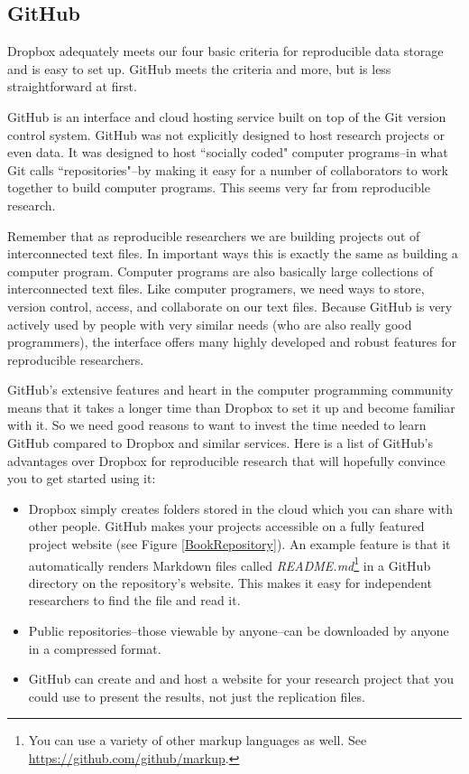 \subsection{GitHub}

Dropbox adequately meets our four basic criteria for reproducible data storage and is easy to set up. GitHub meets the criteria and more, but is less straightforward at first.

GitHub is an interface and cloud hosting service built on top of the Git version control system. GitHub was not explicitly designed to host research projects or even data. It was designed to host ``socially coded" computer programs--in what Git calls ``repositories"--by making it easy for a number of collaborators to work together to build computer programs. This seems very far from reproducible research.

Remember that as reproducible researchers we are building projects out of interconnected text files. In important ways this is exactly the same as building a computer program. Computer programs are also basically large collections of interconnected text files. Like computer programers, we need ways to store, version control, access, and collaborate on our text files. Because GitHub is very actively used by people with very similar needs (who are also really good programmers), the interface offers many highly developed and robust features for reproducible researchers.

GitHub's extensive features and heart in the computer programming community means that it takes a longer time than Dropbox to set it up and become familiar with it. So we need good reasons to want to invest the time needed to learn GitHub compared to Dropbox and similar services. Here is a list of GitHub's advantages over Dropbox for reproducible research that will hopefully convince you to get started using it: \\[0.25cm]

\begin{itemize}
    \item Dropbox simply creates folders stored in the cloud which you can share with other people. GitHub makes your projects accessible on a fully featured project website (see Figure \ref{BookRepository}). An example feature is that it automatically renders Markdown files called {\emph{README.md}}\footnote{You can use a variety of other markup languages as well. See \url{https://github.com/github/markup}.} in a GitHub directory on the repository's website. This makes it easy for independent researchers to find the file and read it.   
    \item Public repositories--those viewable by anyone--can be downloaded by anyone in a compressed format.
    \item GitHub can create and and host a website for your research project that you could use to present the results, not just the replication files.
\end{itemize} 

